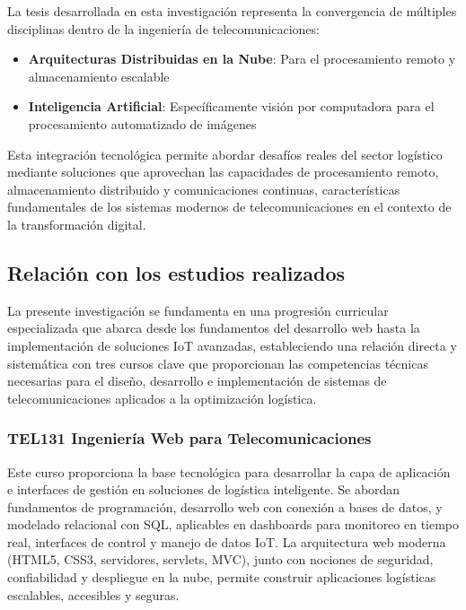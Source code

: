 La tesis desarrollada en esta investigación representa la convergencia de múltiples disciplinas dentro de la ingeniería de telecomunicaciones:

\begin{itemize}
    \item \textbf{Arquitecturas Distribuidas en la Nube}: Para el procesamiento remoto y almacenamiento escalable
    \item \textbf{Inteligencia Artificial}: Específicamente visión por computadora para el procesamiento automatizado de imágenes
\end{itemize}

Esta integración tecnológica permite abordar desafíos reales del sector logístico mediante soluciones que aprovechan las capacidades de procesamiento remoto, almacenamiento distribuido y comunicaciones continuas, características fundamentales de los sistemas modernos de telecomunicaciones en el contexto de la transformación digital.

\subsection{Relación con los estudios realizados}

La presente investigación se fundamenta en una progresión curricular especializada que abarca desde los fundamentos del desarrollo web hasta la implementación de soluciones IoT avanzadas, estableciendo una relación directa y sistemática con tres cursos clave que proporcionan las competencias técnicas necesarias para el diseño, desarrollo e implementación de sistemas de telecomunicaciones aplicados a la optimización logística.

\subsubsection{TEL131 Ingeniería Web para Telecomunicaciones}

Este curso proporciona la base tecnológica para desarrollar la capa de aplicación e interfaces de gestión en soluciones de logística inteligente. Se abordan fundamentos de programación, desarrollo web con conexión a bases de datos, y modelado relacional con SQL, aplicables en dashboards para monitoreo en tiempo real, interfaces de control y manejo de datos IoT. La arquitectura web moderna (HTML5, CSS3, servidores, servlets, MVC), junto con nociones de seguridad, confiabilidad y despliegue en la nube, permite construir aplicaciones logísticas escalables, accesibles y seguras.

